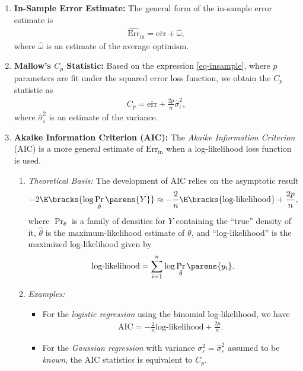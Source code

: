 \documentclass[12pt]{article}
\begin{document}
\begin{enumerate}[label=\textbf{\arabic*.}]

	\item \textbf{In-Sample Error Estimate:} The general form of the in-sample error estimate is 
	\begin{align*}
		\widehat{\mathrm{Err}}_{\mathrm{in}} = \overline{\mathrm{err}} + \hat{\omega}, 
	\end{align*}
	where $\hat{\omega}$ is an estimate of the average optimism. 
	
	\item \textbf{Mallow's $C_p$ Statistic:} Based on the expression \eqref{eq-insample}, where $p$ parameters are fit under the squared error loss function, we obtain the $C_p$ statistic as
	\begin{align}
		C_p = \overline{\mathrm{err}} + \frac{2p}{n} \hat{\sigma}_{\varepsilon}^2, 
	\end{align}
	where $\hat{\sigma}_{\varepsilon}^2$ is an estimate of the variance. 
	
	\item \textbf{Akaike Information Criterion (AIC):} The \textit{Akaike Information Criterion} (AIC) is a more general estimate of $\mathrm{Err}_{\mathrm{in}}$ when a log-likelihood loss function is used. 
	\begin{enumerate}
		\item \textit{Theoretical Basis:} The development of AIC relies on the asymptotic result 
		\begin{align*}
			-2 \E \bracks{ \log \Pr_{\hat{\theta} } \parens{Y}} \approx - \frac{2}{n} \E \bracks{\text{log-likelihood}} + \frac{2p}{n}, 
		\end{align*}
		where $ \Pr_{\theta} $ is a family of densities for $Y$ containing the ``true'' density of it, $\hat{\theta}$ is the maximum-likelihood estimate of $\theta$, and ``log-likelihood'' is the maximized log-likelihood given by 
		\begin{align*}
			\text{log-likelihood} = \sum_{i=1}^n \log \Pr_{\hat{\theta}}\parens{y_i}. 
		\end{align*}
		
		\item \textit{Examples:}
		\begin{itemize}
			\item For the \textit{logistic regression} using the binomial log-likelihood, we have 
			\begin{align}
				\mathrm{AIC} = - \frac{2}{n} \text{log-likelihood} + \frac{2p}{n}. 
			\end{align}
			\item For the \textit{Gaussian regression} with variance $\sigma_{\varepsilon}^2 = \hat{\sigma}_{\varepsilon}^2$ assumed to be \emph{known}, the {AIC} statistics is equivalent to $C_p$. 
		\end{itemize}
		

\end{enumerate}
\end{enumerate}
\end{document}
